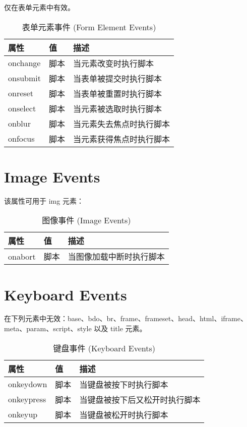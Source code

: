 仅在表单元素中有效。


\begin{table}[!h]
\centering
\caption{表单元素事件 (Form Element Events)}
\begin{tabular}{|l|l|l|}
\hline
属性		&值		&描述\\
\hline
onchange&脚本	&当元素改变时执行脚本\\
\hline
onsubmit	&脚本	&当表单被提交时执行脚本\\
\hline
onreset	&脚本	&当表单被重置时执行脚本\\
\hline
onselect	&脚本	&当元素被选取时执行脚本\\
\hline
onblur	&脚本	&当元素失去焦点时执行脚本\\
\hline
onfocus	&脚本	&当元素获得焦点时执行脚本\\
\hline
\end{tabular}
\end{table}








\chapter{Image Events}

该属性可用于 img 元素：

\begin{table}[!h]
\centering
\caption{图像事件 (Image Events)}
\begin{tabular}{|l|l|l|}
\hline
属性		&值		&描述\\
\hline
onabort	&脚本	&当图像加载中断时执行脚本\\
\hline
\end{tabular}
\end{table}




\chapter{Keyboard Events}


在下列元素中无效：base、bdo、br、frame、frameset、head、html、iframe、meta、param、script、style 以及 title 元素。

\begin{table}[!h]
\centering
\caption{键盘事件 (Keyboard Events)}
\begin{tabular}{|l|l|l|}
\hline
属性			&值	&描述\\
\hline
onkeydown	&脚本	&当键盘被按下时执行脚本\\
\hline
onkeypress	&脚本	&当键盘被按下后又松开时执行脚本\\
\hline
onkeyup		&脚本	&当键盘被松开时执行脚本\\
\hline
\end{tabular}
\end{table}







